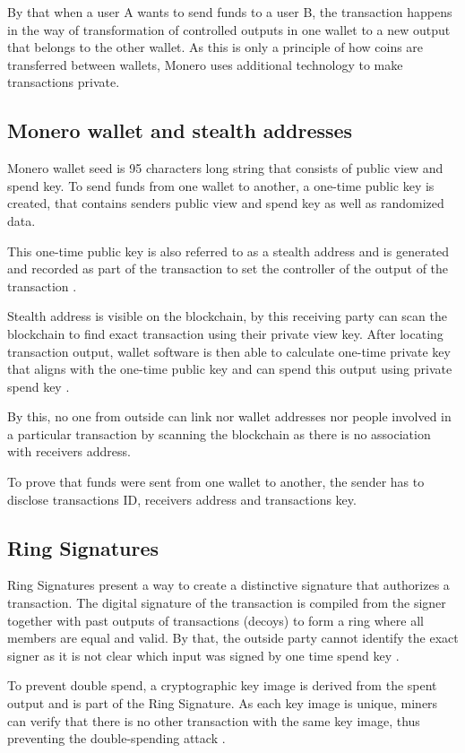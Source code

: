 \documentclass[
  printed, %
  table,   %
  lof,     %
  lot,     %
           oneside, color
]{fithesis3}
\begin{document}
By that when a user A wants to send funds to a user B, the transaction happens in the way of transformation of controlled outputs in one wallet to a new output that belongs to the other wallet. As this is only a principle of how coins are transferred between wallets, Monero uses additional technology to make transactions private.
\subsection{Monero wallet and stealth addresses}
\label{sec:stealthaddresses}
Monero wallet seed is 95 characters long string that consists of public view and spend key. To send funds from one wallet to another, a one-time public key is created, that contains senders public view and spend key as well as randomized data. 

This one-time public key is also referred to as a stealth address and is generated and recorded as part of the transaction to set the controller of the output of the transaction \cite{seguias2018monero}.

Stealth address is visible on the blockchain, by this receiving party can scan the blockchain to find exact transaction using their private view key. After locating transaction output, wallet software is then able to calculate one-time private key that aligns with the one-time public key and can spend this output using private spend key \cite{courtois2017stealth}.

By this, no one from outside can link nor wallet addresses nor people involved in a particular transaction by scanning the blockchain as there is no association with receivers address.

To prove that funds were sent from one wallet to another, the sender has to disclose transactions ID, receivers address and transactions key.

\subsection{Ring Signatures}
\label{sec:ringsignatures}
Ring Signatures present a way to create a distinctive signature that authorizes a transaction. The digital signature of the transaction is compiled from the signer together with past outputs of transactions (decoys) to form a ring where all members are equal and valid. By that, the outside party cannot identify the exact signer as it is not clear which input was signed by one time spend key \cite{mercer2016privacy}.

To prevent double spend, a cryptographic key image is derived from the spent output and is part of the Ring Signature. As each key image is unique, miners can verify that there is no other transaction with the same key image, thus preventing the double-spending attack \cite{miller2017empirical}.
\end{document}
